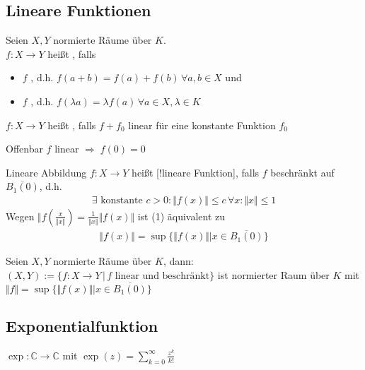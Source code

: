 \subsection*{Lineare Funktionen} 
\begin{*definition}
	Seien $X,Y$ normierte Räume über $K$.\\
	$f: X\rightarrow Y$ heißt , falls
	\begin{itemize}
		\item $f$ , d.h. $f(a+b) = f(a) + f(b) \,\forall a,b\in X$ und
		\item $f$ , d.h. $f(\lambda a) = \lambda f(a)\,\forall a\in X,\lambda\in K$
	\end{itemize}

	$f:X\to Y$ heißt , falls $f+f_0$ linear für eine konstante Funktion $f_0$
	
	Offenbar $f$ linear $\Rightarrow\;f(0) = 0$
\end{*definition}
\begin{*definition}
	Lineare Abbildung $f:X\to Y$ heißt [!lineare Funktion], falls $f$ beschränkt auf $\overline{B_1(0)}$, d.h. \begin{align}
		\tag{1}\exists\text{ konstante }c > 0: \Vert f(x)\Vert \le c\,\forall x: \Vert x\Vert \le 1
	\end{align}
	Wegen $\Vert f\left( \frac{x}{\Vert x \Vert}\right) = \frac{1}{\Vert x \Vert} \Vert f(x) \Vert$ ist (1) äquivalent zu
	\begin{align}
		\tag{1'} \Vert f(x) \Vert = \sup \{ \Vert f(x) \Vert | x \in \overline{B_1(0)}\}
	\end{align}
\end{*definition}
\begin{proposition}
	Seien $X,Y$ normierte Räume über $K$, dann:\\
	$(X,Y):= \{ f:X\to Y \,|\, f \text{ linear und beschränkt} \}$ ist normierter Raum über $K$ mit $\Vert f \Vert = \sup \{ \Vert f(x) \Vert | x\in \overline{B_1(0)} \}$
\end{proposition}

\subsection*{Exponentialfunktion}
\begin{*definition}
	$\exp:\mathbb{C}\to \mathbb{C}$ mit $\exp(z) = \sum_{k=0}^\infty \frac{z^k}{k!}$
\end{*definition}


